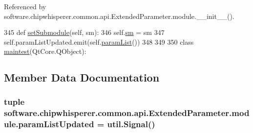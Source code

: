 Referenced by software.\+chipwhisperer.\+common.\+api.\+Extended\+Parameter.\+module.\+\_\+\+\_\+init\+\_\+\+\_\+().


\begin{DoxyCode}
345         \textcolor{keyword}{def }\hyperlink{classsoftware_1_1chipwhisperer_1_1common_1_1api_1_1ExtendedParameter_1_1module_aab8e2f0cfb547c4133072e7e61faeb8c}{setSubmodule}(self, sm):
346             self.\hyperlink{classsoftware_1_1chipwhisperer_1_1common_1_1api_1_1ExtendedParameter_1_1module_ae8580335d1d31a863cb6992c26518746}{sm} = sm
347             self.paramListUpdated.emit(self.\hyperlink{classsoftware_1_1chipwhisperer_1_1common_1_1api_1_1ExtendedParameter_1_1module_ad7ecbcf311435aa8f5cd588fe8ab278c}{paramList}())
348 
349 
350     \textcolor{keyword}{class }\hyperlink{classsoftware_1_1chipwhisperer_1_1common_1_1api_1_1ExtendedParameter_1_1maintest}{maintest}(QtCore.QObject):
\end{DoxyCode}


\subsection{Member Data Documentation}
\hypertarget{classsoftware_1_1chipwhisperer_1_1common_1_1api_1_1ExtendedParameter_1_1module_aacb7c15cb49374166b0f79d25d9e3859}{}
\subsubsection[{param\+List\+Updated}]{\setlength{\rightskip}{0pt plus 5cm}tuple software.\+chipwhisperer.\+common.\+api.\+Extended\+Parameter.\+module.\+param\+List\+Updated = util.\+Signal()\hspace{0.3cm}{\ttfamily [static]}}\label{classsoftware_1_1chipwhisperer_1_1common_1_1api_1_1ExtendedParameter_1_1module_aacb7c15cb49374166b0f79d25d9e3859}
\hypertarget{classsoftware_1_1chipwhisperer_1_1common_1_1api_1_1ExtendedParameter_1_1module_a196c0852bd3e2daef38f573b77622a2f}{}
